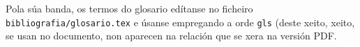 Pola súa banda, os termos do glosario edítanse no ficheiro
\texttt{bibliografia/glo\-sa\-rio.tex} e úsanse empregando a orde
\texttt{gls} (deste xeito, %
xeito, %
se usan no documento, non aparecen na relación que se xera na versión
PDF.
